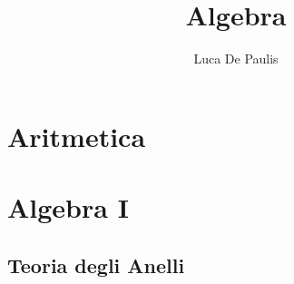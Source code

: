 \documentclass[italian,oneside,headinclude,10pt]{scrbook}
\begin{document}
\author{Luca De Paulis}
\title{Algebra}
\maketitle

\tableofcontents
\part{Aritmetica}
% 
% 
% 
% 
% 

% 















\part{Algebra I}







\chapter{Teoria degli Anelli}







\end{document}
